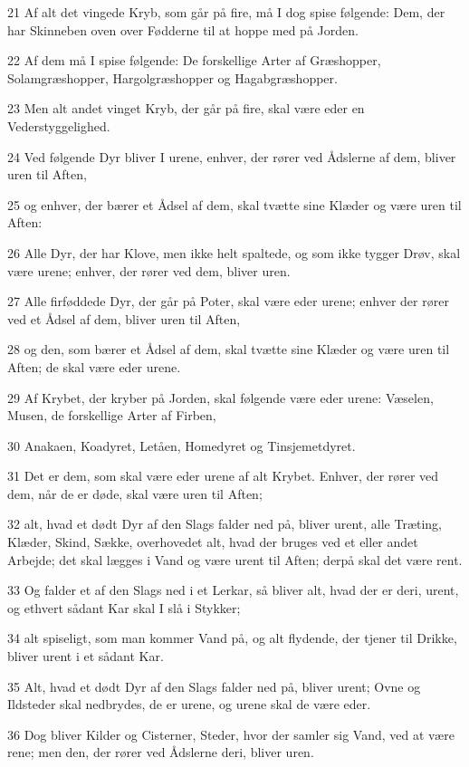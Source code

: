\par 21 Af alt det vingede Kryb, som går på fire, må I dog spise følgende: Dem, der har Skinneben oven over Fødderne til at hoppe med på Jorden.
\par 22 Af dem må I spise følgende: De forskellige Arter af Græshopper, Solamgræshopper, Hargolgræshopper og Hagabgræshopper.
\par 23 Men alt andet vinget Kryb, der går på fire, skal være eder en Vederstyggelighed.
\par 24 Ved følgende Dyr bliver I urene, enhver, der rører ved Ådslerne af dem, bliver uren til Aften,
\par 25 og enhver, der bærer et Ådsel af dem, skal tvætte sine Klæder og være uren til Aften:
\par 26 Alle Dyr, der har Klove, men ikke helt spaltede, og som ikke tygger Drøv, skal være urene; enhver, der rører ved dem, bliver uren.
\par 27 Alle firføddede Dyr, der går på Poter, skal være eder urene; enhver der rører ved et Ådsel af dem, bliver uren til Aften,
\par 28 og den, som bærer et Ådsel af dem, skal tvætte sine Klæder og være uren til Aften; de skal være eder urene.
\par 29 Af Krybet, der kryber på Jorden, skal følgende være eder urene: Væselen, Musen, de forskellige Arter af Firben,
\par 30 Anakaen, Koadyret, Letåen, Homedyret og Tinsjemetdyret.
\par 31 Det er dem, som skal være eder urene af alt Krybet. Enhver, der rører ved dem, når de er døde, skal være uren til Aften;
\par 32 alt, hvad et dødt Dyr af den Slags falder ned på, bliver urent, alle Træting, Klæder, Skind, Sække, overhovedet alt, hvad der bruges ved et eller andet Arbejde; det skal lægges i Vand og være urent til Aften; derpå skal det være rent.
\par 33 Og falder et af den Slags ned i et Lerkar, så bliver alt, hvad der er deri, urent, og ethvert sådant Kar skal I slå i Stykker;
\par 34 alt spiseligt, som man kommer Vand på, og alt flydende, der tjener til Drikke, bliver urent i et sådant Kar.
\par 35 Alt, hvad et dødt Dyr af den Slags falder ned på, bliver urent; Ovne og Ildsteder skal nedbrydes, de er urene, og urene skal de være eder.
\par 36 Dog bliver Kilder og Cisterner, Steder, hvor der samler sig Vand, ved at være rene; men den, der rører ved Ådslerne deri, bliver uren.
